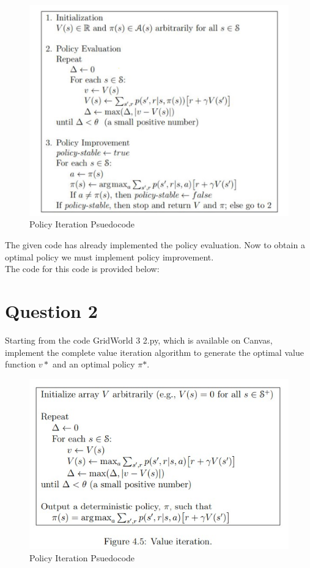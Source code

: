 \documentclass[11pt]{article}
\begin{document}
\begin{figure}[H]
    \begin{center}
        \includegraphics*[scale = 0.5]{Policy Iterattion.jpg}
        \caption{Policy Iteration Psuedocode}            
    \end{center}
\end{figure}

The given code has already implemented the policy evaluation. Now to obtain a optimal policy we must implement policy improvement.
\\
The code for this code is provided below:
\\


\newpage
\section*{Question 2}
Starting from the code GridWorld 3 2.py, which is available on Canvas, implement the
complete value iteration algorithm to generate the optimal value function $v*$ and an optimal
policy \(\pi\)\(*\).
\begin{figure}[H]
    \begin{center}
        \includegraphics*[scale = 1]{Value Iteration.jpg}
        \caption{Policy Iteration Psuedocode}            
    \end{center}
\end{figure}

\end{document}
